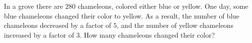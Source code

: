 In a grove there are $280$ chameleons, colored either blue or yellow. One day, some blue chameleons changed their color to yellow. As a result, the number of blue chameleons decreased by a factor of $5$, and the number of yellow chameleons increased by a factor of $3$. How many chameleons changed their color?

